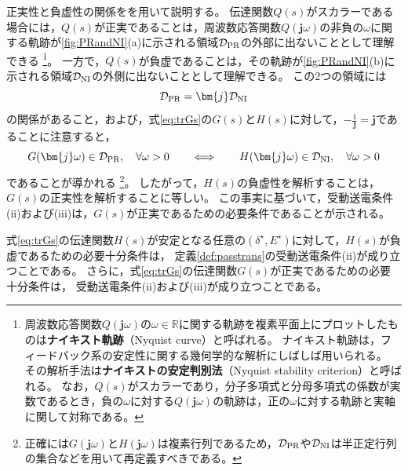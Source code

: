 \documentclass[tombow,dvipdfmx]{corona-a5-1.1}
\begin{document}
正実性と負虚性の関係をを用いて説明する。
伝達関数$Q(s)$がスカラーである場合には，$Q(s)$が正実であることは，周波数応答関数$Q(\bm{j} \omega)$の非負の$\omega$に関する軌跡が\ref{fig:PRandNI}(a)に示される領域$\mathcal{D}_{\rm PR}$の外部に出ないこととして理解できる
\footnote{
周波数応答関数$Q(\bm{j} \omega)$の$\omega \in \mathbb{R}$に関する軌跡を複素平面上にプロットしたものは\textbf{ナイキスト軌跡}（Nyquist curve）と呼ばれる。
ナイキスト軌跡は，フィードバック系の安定性に関する幾何学的な解析にしばしば用いられる。
その解析手法は\textbf{ナイキストの安定判別法}（Nyquist stability criterion）と呼ばれる。
なお，$Q(s)$がスカラーであり，分子多項式と分母多項式の係数が実数であるとき，負の$\omega$に対する$Q(\bm{j} \omega)$の軌跡は，正の$\omega$に対する軌跡と実軸に関して対称である。
}。
一方で，$Q(s)$が負虚であることは，その軌跡が\ref{fig:PRandNI}(b)に示される領域$\mathcal{D}_{\rm NI}$の外側に出ないこととして理解できる。
この2つの領域には
\[
\mathcal{D}_{\rm PR} = \bm{j} \mathcal{D}_{\rm NI}
\]
の関係があること，および，式\ref{eq:trGs}の$G(s)$と$H(s)$に対して，$-\tfrac{1}{\bm{j}}=\bm{j}$であることに注意すると，
\[
G(\bm{j} \omega) \in \mathcal{D}_{\rm PR}, 
\quad \forall \omega >0
\qquad
\Longleftrightarrow
\qquad
H(\bm{j} \omega) \in \mathcal{D}_{\rm NI} ,
\quad \forall \omega >0
\]
であることが導かれる
\footnote{
正確には$G(\bm{j} \omega)$と$H(\bm{j} \omega)$は複素行列であるため，$\mathcal{D}_{\rm PR}$や$\mathcal{D}_{\rm NI}$は半正定行列の集合などを用いて再定義すべきである。
}。
したがって，$H(s)$の負虚性を解析することは，$G(s)$の正実性を解析することに等しい。
この事実に基づいて，受動送電条件(ii)および(iii)は，$G(s)$が正実であるための必要条件であることが示される。

\begin{定理}[電気サブシステムの伝達関数の正実性]
\label{thm:EdynNI}
式\ref{eq:trGs}の伝達関数$H(s)$が安定となる任意の$(\delta^{\star},E^{\star})$に対して，$H(s)$が負虚であるための必要十分条件は，
定義\ref{def:passtrans}の受動送電条件(ii)が成り立つことである。
さらに，式\ref{eq:trGs}の伝達関数$G(s)$が正実であるための必要十分条件は，
受動送電条件(ii)および(iii)が成り立つことである。
\end{定理}
\end{document}
